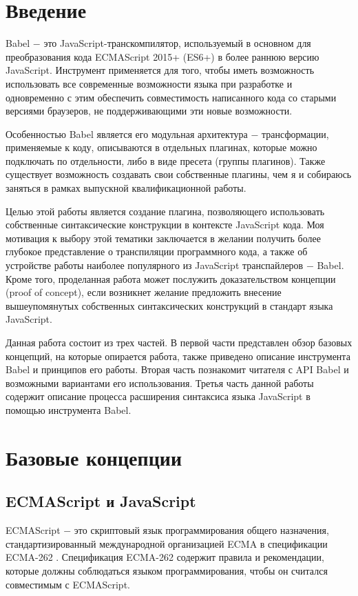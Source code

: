\documentclass[14pt, a4paper]{article}
\begin{document}

\tableofcontents
\pagebreak

\section*{Введение}
Babel $-$ это JavaScript-транскомпилятор, используемый в основном для преобразования кода ECMAScript 
2015+ (ES6+) в более раннюю версию JavaScript. Инструмент применяется для того, чтобы иметь 
возможность использовать все современные возможности языка при разработке и одновременно с этим 
обеспечить совместимость написанного кода со старыми версиями браузеров, не поддерживающими эти новые 
возможности.

Особенностью Babel является его модульная архитектура $-$ трансформации, применяемые к коду, 
описываются в отдельных плагинах, которые можно подключать по отдельности, либо в виде пресета 
(группы плагинов). Также существует возможность создавать свои собственные плагины, чем я и собираюсь
 заняться в рамках выпускной квалификационной работы.

Целью этой работы является создание плагина, позволяющего использовать собственные синтаксические 
конструкции в контексте JavaScript кода. Моя мотивация к выбору этой тематики заключается в желании 
получить более глубокое представление о транспиляции программного кода, а также об устройстве работы 
наиболее популярного из JavaScript транспайлеров $-$ Babel. Кроме того, проделанная работа может 
послужить доказательством концепции (proof of concept), если возникнет желание предложить внесение 
вышеупомянутых собственных синтаксических конструкций в стандарт языка JavaScript.

Данная работа состоит из трех частей. В первой части представлен обзор базовых концепций, 
на которые опирается работа, также приведено описание инструмента Babel и принципов его работы. 
Вторая часть познакомит читателя с API Babel и возможными вариантами его использования. Третья часть 
данной работы содержит описание процесса расширения синтаксиса языка JavaScript в помощью инструмента Babel.

\pagebreak
\section{Базовые концепции}
\subsection{ECMAScript и JavaScript}
ECMAScript $-$ это скриптовый язык программирования общего назначения, стандартизированный международной 
организацией ECMA в спецификации ECMA-262 \cite{ecma-262}. Спецификация ECMA-262 содержит правила и рекомендации, 
которые должны соблюдаться языком программирования, чтобы он считался совместимым с ECMAScript.
\end{document}
